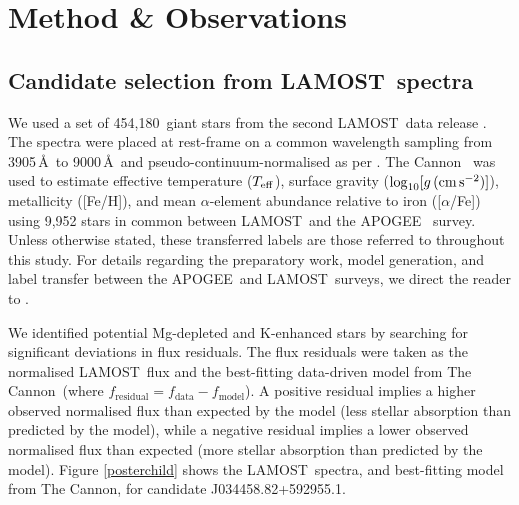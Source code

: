 \documentclass[a4paper,fleqn,usenatbib]{mnras}
\newcommand{\LamostGiants}{454,180}
\newcommand{\project}[1]{#1}
\newcommand{\lamost}{\project{LAMOST}}
\newcommand{\apogee}{\project{APOGEE}}
\newcommand{\tc}{\project{The Cannon}}
\newcommand{\teff}{T_{\rm eff}}
\newcommand{\logg}{\log_{10}[g\,({\rm cm\,s}^{-2})]}
\begin{document}
\section{Method \& Observations}
\label{sec:method}
\subsection{Candidate selection from \lamost\ spectra}
We used a set of \LamostGiants\ giant stars from the second \lamost\ data release \citep{luo2016vizier}. The spectra were placed at rest-frame on a common wavelength sampling from 3905\,\AA\ to 9000\,\AA\ and pseudo-continuum-normalised as per \citet{ho2017}. \tc\ \citep{ness2016,ho2017} was used to estimate effective temperature ($\teff$), surface gravity ($\logg$), metallicity ([Fe/H]), and mean $\alpha$-element abundance relative to iron ([$\alpha$/Fe]) using 9,952 stars in common between \lamost\ and the \apogee\ \citep{alam2015} survey. Unless otherwise stated, these transferred labels are those referred to throughout this study. For details regarding the preparatory work, model generation, and label transfer between the \apogee\ and \lamost\ surveys, we direct the reader to \citet{ho2017}. 

We identified potential Mg-depleted and K-enhanced stars by searching for significant deviations in flux residuals. The flux residuals were taken as the normalised \lamost\ flux and the best-fitting data-driven model from \tc\ (where $f_{\textrm{residual}} = f_{\textrm{data}} - f_{\textrm{model}}$). A positive residual implies a higher observed normalised flux than expected by the model (less stellar absorption than predicted by the model), while a negative residual implies a lower observed normalised flux than expected (more stellar absorption than predicted by the model). Figure \ref{posterchild} shows the \lamost\ spectra, and best-fitting model from \tc, for candidate J034458.82+592955.1.
\end{document}
